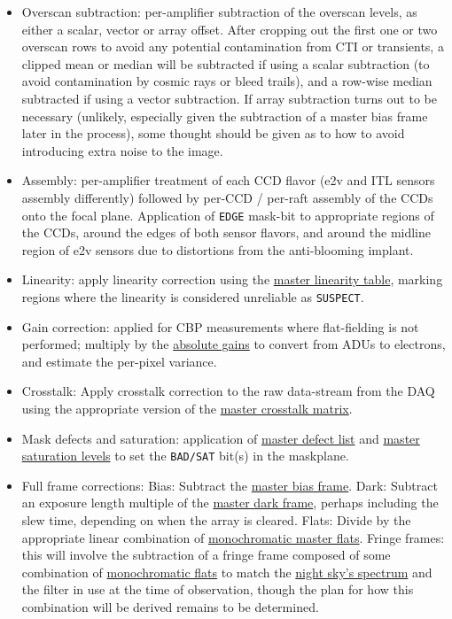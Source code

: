 \begin{itemize}

\item Overscan subtraction: per-amplifier subtraction of the overscan levels, as either a scalar, vector or array offset. After cropping out the first one or two overscan rows to avoid any potential contamination from CTI or transients, a clipped mean or median will be subtracted if using a scalar subtraction (to avoid contamination by cosmic rays or bleed trails), and a row-wise median subtracted if using a vector subtraction. If array subtraction turns out to be necessary (unlikely, especially given the subtraction of a master bias frame later in the process), some thought should be given as to how to avoid introducing extra noise to the image.

\item Assembly: per-amplifier treatment of each CCD flavor (e2v and ITL sensors assembly differently) followed by per-CCD / per-raft assembly of the CCDs onto the focal plane. Application of \texttt{EDGE} mask-bit to appropriate regions of the CCDs, \ie around the edges of both sensor flavors, and around the midline region of e2v sensors due to distortions from the anti-blooming implant.

\item Linearity: apply linearity correction using the \hyperref[sec:CPP:output:linearityCurve]{master linearity table}, marking
regions where the linearity is considered unreliable as \texttt{SUSPECT}.

\item Gain correction: applied for CBP measurements where flat-fielding is not performed; multiply by the \hyperref[sec:CPP:output:gains]{absolute gains} to convert from ADUs to electrons, and estimate the per-pixel variance.

\item Crosstalk: Apply crosstalk correction to the raw data-stream from the DAQ using the appropriate version of the \hyperref[sec:CPP:output:crosstalk]{master crosstalk matrix}.

\item Mask defects and saturation: application of \hyperref[sec:CPP:output:defectList]{master defect list} and \hyperref[sec:CPP:output:saturationLevel]{master saturation levels} to set the \texttt{BAD/SAT} bit(s) in the maskplane.

\item Full frame corrections:
	\mysubitem Bias: Subtract the \hyperref[sec:CPP:output:bias]{master bias frame}.
	\mysubitem Dark: Subtract an exposure length multiple of the \hyperref[sec:CPP:output:dark]{master dark frame}, perhaps including the slew time, depending on when the array is cleared.
	\mysubitem Flats: Divide by the appropriate linear combination of  \hyperref[sec:CPP:output:monoPhotoFlat]{monochromatic master flats}.
	\mysubitem Fringe frames: this will involve the subtraction of a fringe frame composed of some combination of \hyperref[sec:CPP:output:monoFlat]{monochromatic flats} to match the \hyperref[sec:CPP:aux:nightSkySpectrum]{night sky's spectrum} and the filter in use at the time of observation, though the plan for how this combination will be derived remains to be determined.



\end{itemize}
